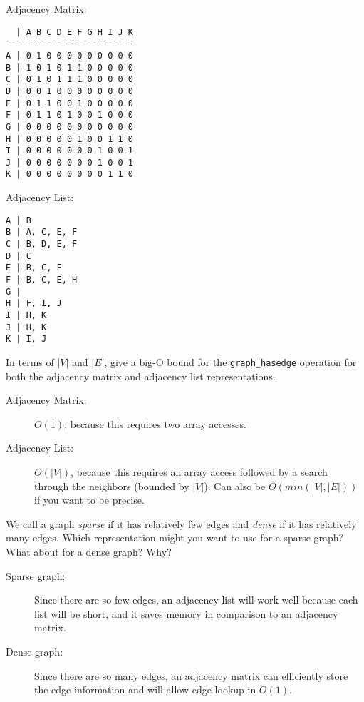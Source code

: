 \vfill
\begin{solution}

Adjacency Matrix:
\begin{verbatim}
  | A B C D E F G H I J K
-------------------------
A | 0 1 0 0 0 0 0 0 0 0 0
B | 1 0 1 0 1 1 0 0 0 0 0
C | 0 1 0 1 1 1 0 0 0 0 0
D | 0 0 1 0 0 0 0 0 0 0 0
E | 0 1 1 0 0 1 0 0 0 0 0
F | 0 1 1 0 1 0 0 1 0 0 0
G | 0 0 0 0 0 0 0 0 0 0 0
H | 0 0 0 0 0 1 0 0 1 1 0
I | 0 0 0 0 0 0 0 1 0 0 1
J | 0 0 0 0 0 0 0 1 0 0 1
K | 0 0 0 0 0 0 0 0 1 1 0
\end{verbatim}

Adjacency List:
\begin{verbatim}
A | B
B | A, C, E, F
C | B, D, E, F
D | C
E | B, C, F
F | B, C, E, H
G |
H | F, I, J
I | H, K
J | H, K
K | I, J
\end{verbatim}
\end{solution}



In terms of $|V|$ and $|E|$, give a big-O bound for the
\lstinline'graph_hasedge' operation for both the adjacency matrix and
adjacency list representations.

\begin{solution}
\begin{description}
\item[Adjacency Matrix: ]%
  $O(1)$, because this requires two array accesses.
\item[Adjacency List: ]%
  $O(|V|)$, because this requires an array access followed by a search
  through the neighbors (bounded by $|V|$). Can also be $O(min(|V|, |E|))$
  if you want to be precise.
\end{description}
\end{solution}



We call a graph \emph{sparse} if it has relatively few edges and
\emph{dense} if it has relatively many edges. Which representation
might you want to use for a sparse graph? What about for a dense
graph? Why?

\begin{solution}
\begin{description}
\item[Sparse graph: ]%
  Since there are so few edges, an adjacency list will work well
  because each list will be short, and it saves memory in comparison
  to an adjacency matrix.
\item[Dense graph: ]%
  Since there are so many edges, an adjacency matrix can efficiently
  store the edge information and will allow edge lookup in $O(1)$.
\end{description}
\end{solution}

